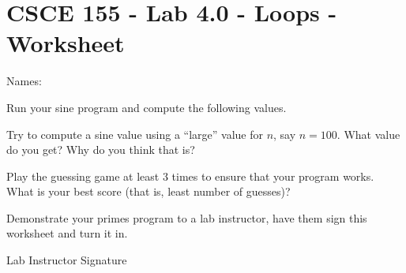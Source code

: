 \documentclass[12pt]{exam}
\begin{document}
\section*{CSCE 155 - Lab 4.0 - Loops - Worksheet}

Names: \underline{\hspace{10cm}}

\begin{questions}

\question Run your sine program and compute the following values.

\question Try to compute a sine value using a ``large'' value for $n$, say $n = 100$.
What value do you get?  Why do you think that is?
    \begin{solution}[3cm]
    \end{solution}

\question Play the guessing game at least 3 times to ensure that your program works.  What is your best score (that is, least number of guesses)?
    \begin{solution}[3cm]
    \end{solution}

\question Demonstrate your primes program to a lab instructor, have them sign this worksheet and turn it in.
\end{questions}
  
Lab Instructor Signature\underline{\hspace{7.5cm}}
\end{document}
